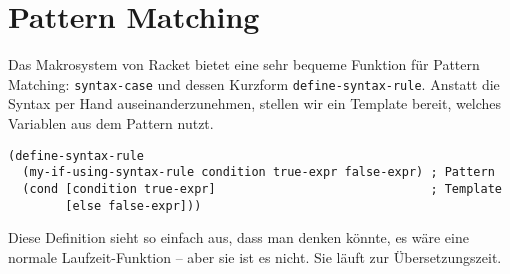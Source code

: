 \section{Pattern Matching}
Das Makrosystem von Racket bietet eine sehr bequeme Funktion für Pattern Matching: \texttt{syntax-case} und dessen Kurzform \texttt{define-syntax-rule}. Anstatt die Syntax per Hand auseinanderzunehmen, stellen wir ein Template bereit, welches Variablen aus dem Pattern nutzt.

% 




\begin{lstlisting}
(define-syntax-rule 
  (my-if-using-syntax-rule condition true-expr false-expr) ; Pattern
  (cond [condition true-expr]                              ; Template
        [else false-expr]))
\end{lstlisting}

Diese Definition sieht so einfach aus, dass man denken könnte, es wäre eine normale Laufzeit-Funktion -- aber sie ist es nicht. Sie läuft zur Übersetzungszeit. 

